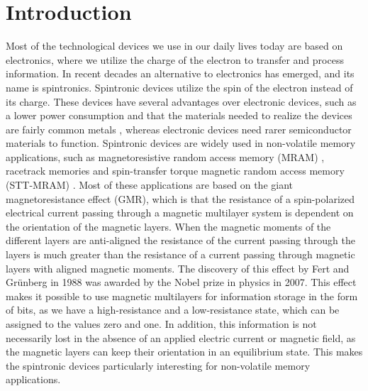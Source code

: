 \chapter{Introduction}
Most of the technological devices we use in our daily lives today are based on electronics, where we utilize the charge of the electron to transfer and process information. In recent decades an alternative to electronics has emerged, and its name is spintronics. Spintronic devices utilize the spin of the electron instead of its charge. These devices have several advantages over electronic devices, such as a lower power consumption and that the materials needed to realize the devices are fairly common metals \cite{Okamoto2014}, whereas electronic devices need rarer semiconductor materials to function. Spintronic devices are widely used in non-volatile memory applications, such as magnetoresistive random access memory (MRAM) \cite{Akerman2005,Katine2008}, racetrack memories \cite{Parkin2008} and spin-transfer torque magnetic random access memory (STT-MRAM) \cite{Kent2015}. Most of these applications are based on the giant magnetoresistance effect (GMR), which is that the resistance of a spin-polarized electrical current passing through a magnetic multilayer system is dependent on the orientation of the magnetic layers. When the magnetic moments of the different layers are anti-aligned the resistance of the current passing through the layers is much greater than the resistance of a current passing through magnetic layers with aligned magnetic moments. The discovery of this effect by Fert \cite{Fert1988} and Gr\"{u}nberg \cite{Grunberg1989} in 1988 was awarded by the Nobel prize in physics in 2007. This effect makes it possible to use magnetic multilayers for information storage in the form of bits, as we have a high-resistance and a low-resistance state, which can be assigned to the values zero and one. In addition, this information is not necessarily lost in the absence of an applied electric current or magnetic field, as the magnetic layers can keep their orientation in an equilibrium state. This makes the spintronic devices particularly interesting for non-volatile memory applications.

